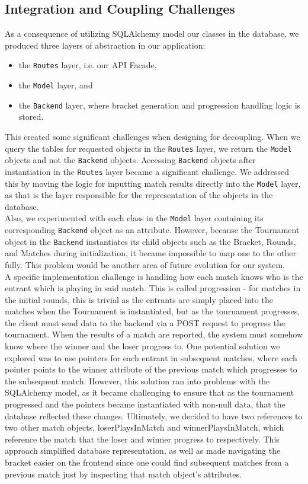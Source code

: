 \documentclass{article}
\begin{document}
\subsection{Integration and Coupling Challenges}
As a consequence of utilizing SQLAlchemy model our classes in the database, we produced three 
layers of abstraction in our application: 
\begin{itemize}
    \item{the \texttt{Routes} layer, i.e. our API Facade, }
    \item{the \texttt{Model} layer, and}
    \item{the \texttt{Backend}
    layer, where bracket generation and progression handling logic is stored.}
\end{itemize}  This created some significant
challenges when designing for decoupling. When we query the tables for requested objects in the \texttt{Routes} layer, 
we return the \texttt{Model} objects and not the \texttt{Backend} objects. Accessing \texttt{Backend} objects
after instantiation in the \texttt{Routes} layer became a significant challenge. We addressed this by moving the logic for inputting
match results directly into the \texttt{Model} layer, as that is the layer responsible for the representation of the objects 
in the database. \\
Also, we experimented with each class in the \texttt{Model} layer containing its corresponding \texttt{Backend} object 
as an attribute. However, because the Tournament object in the \texttt{Backend} instantiates its child objects such as the Bracket, 
Rounds, and Matches during initialization, it became impossible to map one to the other fully. This problem would be another 
area of future evolution for our system.
\\A specific implementation challenge is handling how each match knows who is the entrant which is playing 
in said match. This is called progression - for matches in the initial rounds, this is trivial as 
the entrants are simply placed into the matches when the Tournament is instantiated, but as the tournament
progresses, the client must send data to the backend via a POST request to progress the tournament.
When the results of a match are reported, the system must somehow know where the winner and the loser progress to.
One potential solution we explored was to use pointers for each entrant in subsequent matches, where each pointer 
points to the winner attribute of the previous match which progresses to the subsequent match. However, this 
solution ran into problems with the SQLAlchemy model, as it became challenging to ensure that as the tournament 
progressed and the pointers became instantiated with non-null data, that the database reflected these changes. 
Ultimately, we decided to have two references to two other match objects, loserPlaysInMatch and winnerPlaysInMatch, 
which reference the match that the loser and winner progress to respectively. This approach simplified database 
representation, as well as made navigating the bracket easier on the frontend since one could find subsequent matches
from a previous match just by inspecting that match object's attributes.
\end{document}
